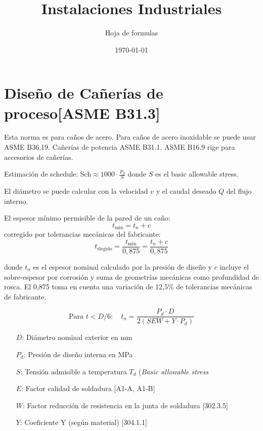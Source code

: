 \documentclass[twocolumn]{article}
\title{Instalaciones Industriales}
\author{Hoja de formulas}
\date{\today}
\begin{document}
	\maketitle
	
	\tableofcontents
\section{Dise\~no de Ca\~ner\'ias de proceso[ASME B31.3]}
Esta norma es para caños de acero. Para caños de acero inoxidable se puede usar ASME B36.19. Cañerías de potencia ASME B31.1. ASME B16.9 rige para accesorios de cañerías.

Estimación de schedule: Sch$\approx 1000\cdot  \frac{P_d}{S}$ donde $S$ es el basic allowable stress.

El diámetro se puede calcular con la velocidad $v$ y el caudal deseado $Q$ del flujo interno.

El espesor mínimo permisible de la pared de un caño:
\[
t_{\min} = t_n+c
\]
corregido por tolerancias mecánicas del fabricante:
\[
t_{\text{elegido}} = \frac{t_{\min}}{0,875} = \frac{t_{n} + c}{0,875}
\]

donde $t_n$ es el espesor nominal calculado por la presión de diseño y $c$ incluye el sobre-espesor por corrosión y suma de geometrías mecánicas como profundidad de rosca. El 0,875 toma en cuenta una variación de 12,5\% de tolerancias mecánicas de fabricante.

\[
\text{Para } t<D/6:\quad t_{n} = \frac{P_d\cdot D}{2(S E W + Y \cdot P_d)}
\]
\begin{itemize}
	\item[$D$:] Diámetro nominal exterior en mm
	\item[$P_d$:] Presión de diseño interna en MPa
	\item[$S$:] Tensión admisible a temperatura $T_d$ (\textit{Basic allowable stress}
	\item[$E$:] Factor calidad de soldadura [A1-A, A1-B]
	\item[$W$:] Factor reducción de resistencia en la junta de soldadura [302.3.5]
	\item[$Y$:] Coeficiente Y (según material) [304.1.1]
\end{itemize}
\end{document}
